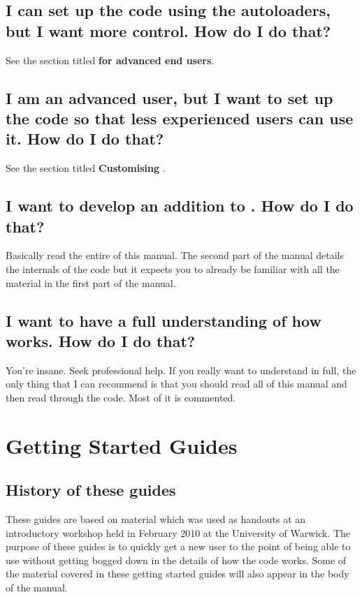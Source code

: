 \documentclass[12pt,a4paper]{article}
\newcommand{\EPOCH}{{\color{warwickdark}\fontfamily{phv}\selectfont{EPOCH}}}
\begin{document}
\subsection{I can set up the code using the autoloaders, but I want more
  control. How do I do that?}
See the section titled {\bf {\EPOCH} for advanced end users}.

\subsection{I am an advanced user, but I want to set up the code so that less
  experienced users can use it. How do I do that?}
See the section titled {\bf Customising {\EPOCH}}.

\subsection{I want to develop an addition to {\EPOCH}. How do I do that?}
Basically read the entire of this manual. The second part of the manual details
the internals of the code but it expects you to already be familiar with all
the material in the first part of the manual.

\subsection{I want to have a full understanding of how {\EPOCH} works. How do I
  do that?}
You're insane. Seek professional help. If you really want to understand {\EPOCH}
in full, the only thing that I can recommend is that you should read all of
this manual and then read through the code. Most of it is commented.
\pagebreak

\section{Getting Started Guides}

\subsection{History of these guides}
These guides are based on material which was used as handouts at an {\EPOCH}
introductory workshop held in February 2010 at the University of Warwick. The
purpose of these guides is to quickly get a new user to the point of being able
to use {\EPOCH} without getting bogged down in the details of how the code
works. Some of the material covered in these getting started guides will also
appear in the body of the manual.
\end{document}
